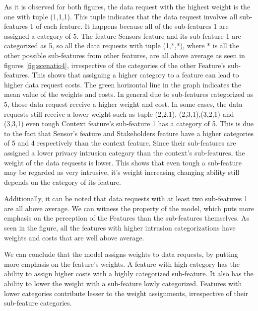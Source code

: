 As it is observed for both figures, the data request with the highest weight is the one with tuple (1,1,1). This tuple indicates that the data request involves all sub-features 1 of each feature. It happens because all of the sub-features 1 are assigned a category of 5. The feature Sensors feature and its sub-feature 1 are categorized as 5, so all the data requests
with tuple (1,*,*), where * is all the other possible sub-features from other features, are all above average as seen in figures \ref{fig:scenatio4}, irrespective of
the categories of the other Feature's sub-features. This shows that assigning a higher category to a feature can lead to higher data request costs. The green horizontal line in the graph indicates the mean value of the weights and costs. In general due to sub-features categorized as 5, those data request receive a higher weight and cost. In some cases, the data requests still receive a lower weight such as tuple (2,2,1),
(2,3,1),(3,2,1) and (3,3,1) even tough Context feature's sub-feature 1 has a category of 5. This is due to the fact that Sensor's feature and Stakeholders feature have a higher categories of 5 and 4 respectively than the context feature. Since their sub-features are assigned a lower privacy intrusion category than the context's sub-features, the weight of the data requests is lower. This shows that even tough a sub-feature may be regarded as very intrusive, it's weight increasing changing ability still depends on the category of its feature.

Additionally, it can be noted that data requests with at least two sub-features 1 are all above average. We can witness the property of the model, which puts more emphasis on the perception of the Features than the sub-features themselves. As seen in the figure, all the features with higher intrusion categorizations have weights and costs that are well above average.

We can conclude that the model assigns weights to data requests, by putting more emphasis on the feature's weights. A feature with high category
has the ability to assign higher costs with a highly categorized sub-feature. It also has the ability to lower the weight  with a sub-feature lowly
categorized. Features with lower categories contribute lesser to the weight assignments, irrespective of their sub-feature categories.

